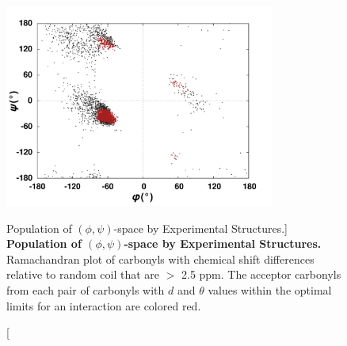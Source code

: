 \begin{figure}
\includegraphics[width=3.5in]{figs/npistar/05-rama.png}
\caption
      [Population of $(\phi,\psi)$-space by Experimental Structures.]{
  {\bf Population of $(\phi,\psi)$-space by Experimental Structures.}
  \\
  Ramachandran plot of carbonyls with \cnmr{} chemical shift differences
  relative to random coil that are $>$ 2.5 ppm. The acceptor carbonyls from
  each pair of carbonyls with $d$ and $\theta$ values within the optimal
  limits for an \npistar{} interaction are colored red.
}
\end{figure}

